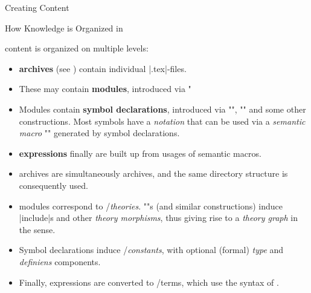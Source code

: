 \begin{sfragment}{Creating \sTeX Content}

  

  \begin{sfragment}{How Knowledge is Organized in \sTeX}

    \sTeX content is organized on multiple levels:
    \begin{itemize}
      \item \sTeX \textbf{archives} (see )
        contain individual |.tex|-files.
      \item These may contain \sTeX \textbf{modules}, introduced via 
      \stexcode"\fi
      \item Modules contain \sTeX \textbf{symbol declarations}, introduced via
        \stexcode"", \stexcode"" and some other
        constructions. Most symbols have a \emph{notation} that can
        be used via a \emph{semantic macro} \stexcode"\symbolname" generated
        by symbol declarations.
      \item \sTeX \textbf{expressions} finally are built up from
        usages of semantic macros.
    \end{itemize}

    \begin{mmtbox}
      \begin{itemize}
        \item \sTeX archives are simultaneously \mmt archives, and the same
          directory structure is consequently used.
        \item \sTeX modules correspond to \omdoc/\mmt \emph{theories}.
          \stexcode"\importmodule"s (and similar constructions) induce 
          \mmt |include|s and other \emph{theory morphisms},
          thus giving rise to a \emph{theory graph} in the \omdoc sense.
        \item Symbol declarations induce \omdoc/\mmt \emph{constants},
          with optional (formal) \emph{type} and \emph{definiens} components.
        \item Finally, \sTeX expressions are converted to \omdoc/\mmt terms,
          which use the syntax of \openmath.
      \end{itemize}
    \end{mmtbox}

	\end{sfragment}


\end{sfragment}
